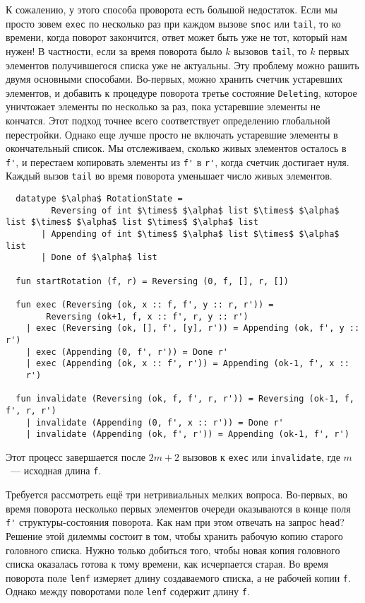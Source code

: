 К сожалению, у этого способа проворота есть большой недостаток. Если
мы просто зовем \lstinline!exec! по несколько раз
при каждом вызове \lstinline!snoc! или \lstinline!tail!, то ко
времени, когда поворот закончится, ответ может быть уже не тот,
который нам нужен! В частности, если за время поворота было $k$
вызовов \lstinline!tail!, то $k$ первых элементов получившегося списка
уже не актуальны. Эту проблему можно рашить двумя основными
способами. Во-первых, можно хранить счетчик устаревших элементов, и
добавить к процедуре поворота третье состояние \lstinline!Deleting!,
которое уничтожает элементы по несколько за раз, пока устаревшие
элементы не кончатся. Этот подход точнее всего соответствует
определению глобальной перестройки. Однако еще лучше просто не
включать устаревшие элементы в окончательный список. Мы отслеживаем,
сколько живых элементов осталось в \lstinline!f'!, и перестаем
копировать элементы из \lstinline!f'! в \lstinline!r'!, когда счетчик
достигает нуля. Каждый вызов \lstinline!tail! во время поворота
уменьшает число живых элементов.
\begin{lstlisting}
  datatype $\alpha$ RotationState =
         Reversing of int $\times$ $\alpha$ list $\times$ $\alpha$ list $\times$ $\alpha$ list $\times$ $\alpha$ list
       | Appending of int $\times$ $\alpha$ list $\times$ $\alpha$ list
       | Done of $\alpha$ list

  fun startRotation (f, r) = Reversing (0, f, [], r, [])
  
  fun exec (Reversing (ok, x :: f, f', y :: r, r')) =
        Reversing (ok+1, f, x :: f', r, y :: r')
    | exec (Reversing (ok, [], f', [y], r')) = Appending (ok, f', y :: r')
    | exec (Appending (0, f', r')) = Done r'
    | exec (Appending (ok, x :: f', r')) = Appending (ok-1, f', x ::
    r')

  fun invalidate (Reversing (ok, f, f', r, r')) = Reversing (ok-1, f, f', r, r')
    | invalidate (Appending (0, f', x :: r')) = Done r'
    | invalidate (Appending (ok, f', r')) = Appending (ok-1, f', r')
\end{lstlisting}
Этот процесс завершается после $2m + 2$ вызовов к \lstinline!exec! или
\lstinline!invalidate!, где $m$~--- исходная длина \lstinline!f!.

Требуется рассмотреть ещё три нетривиальных мелких вопроса. Во-первых,
во время поворота несколько первых элементов очереди оказываются в
конце поля \lstinline!f'! структуры-состояния поворота. Как нам при
этом отвечать на запрос \lstinline!head!? Решение этой дилеммы состоит
в том, чтобы хранить рабочую копию старого головного списка. Нужно
только добиться того, чтобы новая копия головного списка оказалась
готова к тому времени, как исчерпается старая. Во время поворота поле
\lstinline!lenf! измеряет длину создаваемого списка, а не рабочей
копии \lstinline!f!. Однако между поворотами поле \lstinline!lenf!
содержит длину \lstinline!f!.


